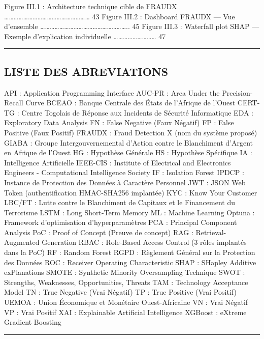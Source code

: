 \documentclass[
  12pt,
]{article}
\begin{document}
Figure III.1 : Architecture technique cible de FRAUDX ………………………………………………
43 Figure III.2 : Dashboard FRAUDX — Vue d’ensemble ………………………………………………..
45 Figure III.3 : Waterfall plot SHAP — Exemple d’explication
individuelle ……………………… 47

\begin{center}\rule{0.5\linewidth}{0.5pt}\end{center}

\subsection{LISTE DES ABREVIATIONS}\label{liste-des-abreviations}

API : Application Programming Interface AUC-PR : Area Under the
Precision-Recall Curve BCEAO : Banque Centrale des États de l’Afrique de
l’Ouest CERT-TG : Centre Togolais de Réponse aux Incidents de Sécurité
Informatique EDA : Exploratory Data Analysis FN : False Negative (Faux
Négatif) FP : False Positive (Faux Positif) FRAUDX : Fraud Detection X
(nom du système proposé) GIABA : Groupe Intergouvernemental d’Action
contre le Blanchiment d’Argent en Afrique de l’Ouest HG : Hypothèse
Générale HS : Hypothèse Spécifique IA : Intelligence Artificielle
IEEE-CIS : Institute of Electrical and Electronics Engineers -
Computational Intelligence Society IF : Isolation Forest IPDCP :
Instance de Protection des Données à Caractère Personnel JWT : JSON Web
Token (authentification HMAC-SHA256 implantée) KYC : Know Your Customer
LBC/FT : Lutte contre le Blanchiment de Capitaux et le Financement du
Terrorisme LSTM : Long Short-Term Memory ML : Machine Learning Optuna :
Framework d’optimisation d’hyperparamètres PCA : Principal Component
Analysis PoC : Proof of Concept (Preuve de concept) RAG :
Retrieval-Augmented Generation RBAC : Role-Based Access Control (3 rôles
implantés dans la PoC) RF : Random Forest RGPD : Règlement Général sur
la Protection des Données ROC : Receiver Operating Characteristic SHAP :
SHapley Additive exPlanations SMOTE : Synthetic Minority Oversampling
Technique SWOT : Strengths, Weaknesses, Opportunities, Threats TAM :
Technology Acceptance Model TN : True Negative (Vrai Négatif) TP : True
Positive (Vrai Positif) UEMOA : Union Économique et Monétaire
Ouest-Africaine VN : Vrai Négatif VP : Vrai Positif XAI : Explainable
Artificial Intelligence XGBoost : eXtreme Gradient Boosting

\begin{center}\rule{0.5\linewidth}{0.5pt}\end{center}
\end{document}
